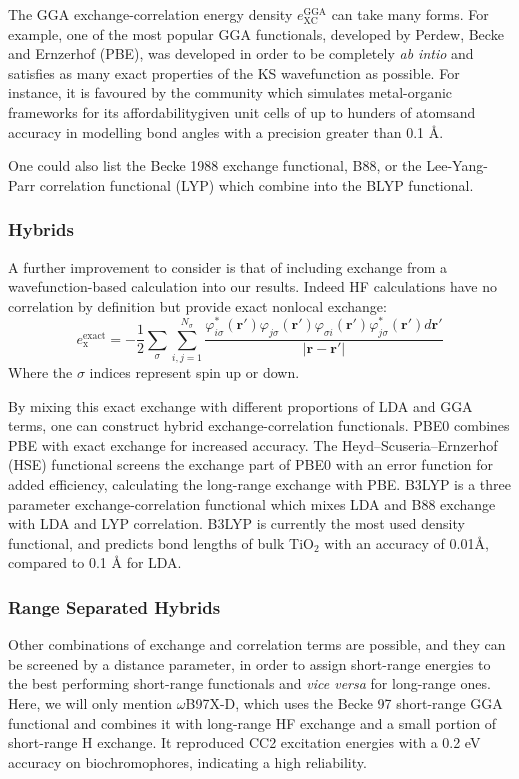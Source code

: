 The GGA exchange-correlation energy density $e^{\text{GGA}}_{\text{XC}}$ can take many forms. For example, one of the most popular GGA functionals, developed by Perdew, Becke and Ernzerhof\cite{Perdew1996} (PBE), was developed in order to be completely \textit{ab intio} and satisfies as many exact properties of the KS wavefunction as possible. For instance, it is favoured by the community which simulates metal-organic frameworks for its affordability\textemdash{}given unit cells of up to hunders of atoms\textemdash{}and accuracy in modelling bond angles with a precision greater than 0.1 \AA{}.\cite{Nazarian2015}

One could also list the Becke 1988 exchange functional, B88\cite{A.D.Becke1988}, or the Lee-Yang-Parr correlation functional (LYP)\cite{Lee1989} which combine into the BLYP functional.

\subsubsection{Hybrids}
A further improvement to consider is that of including exchange from a wavefunction-based calculation into our results. Indeed HF calculations have no correlation by definition but provide exact nonlocal exchange:
\begin{equation}
    e^{\text{exact}}_{\text{x}} = - \frac{1}{2} \sum_{\sigma} \sum_{i,j=1}^{N_{\sigma}}
    \frac{
    \varphi^*_{i \sigma}(\bm{r}') \varphi_{j \sigma}(\bm{r}')
    \varphi_{\sigma i}(\bm{r}') \varphi^*_{j \sigma}(\bm{r}') 
    d\bm{r}'
    }{
    |\bm{r} - \bm{r}'|
    }
\end{equation}
Where the $\sigma$ indices represent spin up or down.

By mixing this exact exchange with different proportions of LDA and GGA terms, one can construct hybrid exchange-correlation functionals. PBE0 combines PBE with exact exchange\cite{Adamo1999} for increased accuracy. The Heyd–Scuseria–Ernzerhof (HSE) functional screens the exchange part of PBE0 with an error function for added efficiency, calculating the long-range exchange with PBE.\cite{Heyd2003,Heyd2006} B3LYP is a three parameter exchange-correlation functional which mixes LDA and B88 exchange with LDA and LYP correlation.\cite{Stephens1994} B3LYP is currently the most used density functional\cite{Zhang2010}, and predicts bond lengths of bulk TiO$_2$ with an accuracy of 0.01\AA{}, compared to 0.1 \AA{} for LDA.

\subsubsection{Range Separated Hybrids}
Other combinations of exchange and correlation terms are possible, and they can be screened by a distance parameter, in order to assign short-range energies to the best performing short-range functionals and \textit{vice versa} for long-range ones. Here, we will only mention $\omega$B97X-D,\cite{Chai2008} which uses the Becke 97 short-range GGA functional\cite{Becke1997} and combines it with long-range HF exchange and a small portion of short-range H exchange. It reproduced CC2 excitation energies with a 0.2 eV accuracy on biochromophores, indicating a high reliability.\cite{Shao2020}

